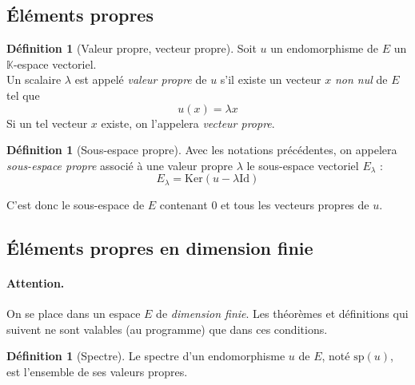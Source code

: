 \documentclass[11pt,a4paper]{report}
\theoremstyle{definition}
\newtheorem{dfn}[theorem]{Définition}
\begin{document}
\subsection{Éléments propres}
\begin{dfn}[Valeur propre, vecteur propre]
     Soit $u$ un endomorphisme de $E$ un $\mathbb{K}$-espace vectoriel.\\ 
     Un scalaire $\lambda$ est appelé \emph{valeur propre} de $u$ s'il existe un vecteur $x$ \emph{non nul} de $E$ tel que 
     \begin{equation}
     u(x) = \lambda x
     \end{equation}
     Si un tel vecteur $x$ existe, on l'appelera \emph{vecteur propre}.
\end{dfn}
\begin{dfn}[Sous-espace propre]
\label{dfn:sous-espace_propre}
     Avec les notations précédentes, on appelera \emph{sous-espace propre} associé à une valeur propre $\lambda$ le sous-espace vectoriel $E_\lambda$ : 
     \begin{equation}
     E_\lambda = \mathrm{Ker} \left( u - \lambda \mathrm{Id} \right) 
     \end{equation}

     C'est donc le sous-espace de $E$ contenant $0$ et tous les vecteurs propres de $u$.
\end{dfn}
\subsection{Éléments propres en dimension finie} %
\label{sub:elements_propres_dim_finie}
\paragraph{Attention.} On se place dans un espace $E$ de \emph{dimension finie}. Les théorèmes et définitions qui suivent ne sont valables (au programme) que dans ces conditions. 
\begin{dfn}[Spectre]
     Le spectre d'un endomorphisme $u$ de $E$, noté $\mathrm{sp}(u)$, est l'ensemble de ses valeurs propres. 
\end{dfn}
\end{document}
